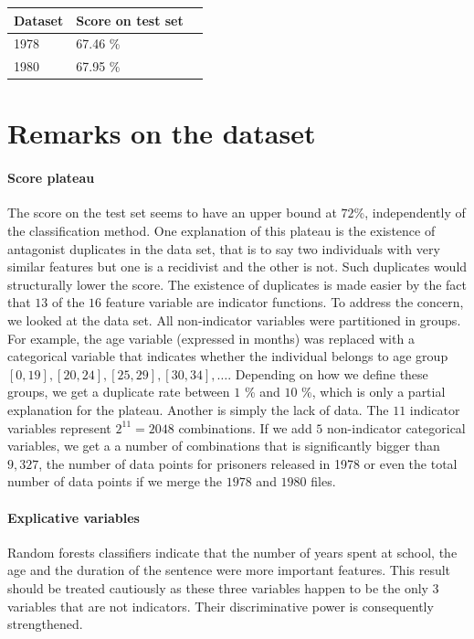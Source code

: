 \documentclass[a0,landscape]{a0poster}
\begin{document}
\begin{multicols}{4}
\begin{center}\vspace{1cm}
\begin{tabular}{l l l}
\toprule
\textbf{Dataset} & \textbf{Score on test set} \\
\midrule
1978 & 67.46 \%  \\
1980 & 67.95 \%  \\
\bottomrule
\end{tabular}
\end{center}\vspace{1cm}


\section*{Remarks on the dataset}

\paragraph{Score plateau}
The score on the test set seems to have an upper bound at $72$\%, independently of the classification method. One explanation of this plateau is the existence of antagonist duplicates in the data set, that is to say two individuals with very similar features but one is a recidivist and the other is not. Such duplicates would structurally lower the score. The existence of duplicates is made easier by the fact that $13$ of the $16$ feature variable are indicator functions. To address the concern, we looked at the data set. All non-indicator variables were partitioned in groups. For example, the age variable (expressed in months) was replaced with a categorical variable that indicates whether the individual belongs to age group $[0,19], [20, 24], [25,29], [30,34], \dots$. Depending on how we define these groups, we get a duplicate rate between $1$ \% and $10$ \%, which is only a partial explanation for the plateau. Another is simply the lack of data. The $11$ indicator variables represent $2^11 = 2048$ combinations. If we add $5$ non-indicator categorical variables, we get a a number of combinations that is significantly bigger than $9,327$, the number of data points for prisoners released in 1978 or even the total number of data points if we merge the $1978$ and $1980$ files.

\paragraph{Explicative variables}
Random forests classifiers indicate that the number of years spent at school, the age and the duration of the sentence were more important features. This result should be treated cautiously as these three variables happen to be the only 3 variables that are not indicators. Their discriminative power is consequently strengthened.


\end{multicols}
\end{document}
